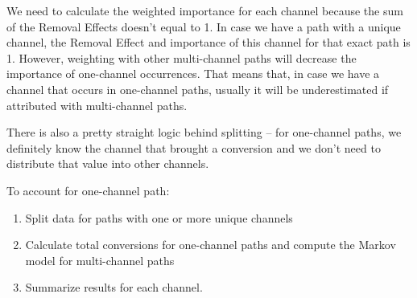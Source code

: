 \documentclass[
]{book}
\providecommand{\tightlist}{%
  \setlength{\itemsep}{0pt}\setlength{\parskip}{0pt}}
\begin{document}
We need to calculate the weighted importance for each channel because the sum of the Removal Effects doesn't equal to 1. In case we have a path with a unique channel, the Removal Effect and importance of this channel for that exact path is 1. However, weighting with other multi-channel paths will decrease the importance of one-channel occurrences. That means that, in case we have a channel that occurs in one-channel paths, usually it will be underestimated if attributed with multi-channel paths.

There is also a pretty straight logic behind splitting -- for one-channel paths, we definitely know the channel that brought a conversion and we don't need to distribute that value into other channels.

To account for one-channel path:

\begin{enumerate}
\def\labelenumi{\arabic{enumi}.}
\tightlist
\item
  Split data for paths with one or more unique channels
\item
  Calculate total conversions for one-channel paths and compute the Markov model for multi-channel paths
\item
  Summarize results for each channel.
\end{enumerate}
\end{document}

